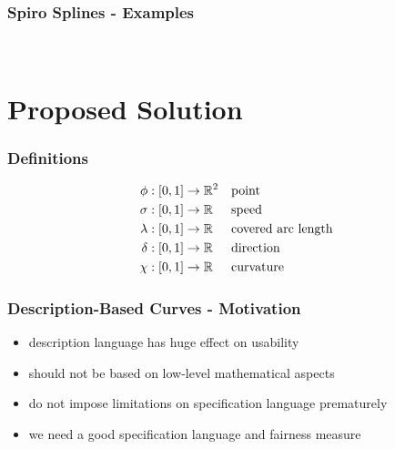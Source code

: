 \documentclass[mathserif]{beamer}
\begin{document}
		\begin{frame}
			\frametitle{Spiro Splines - Examples}
			\\
		\end{frame}
	
	\section{Proposed Solution}

		\begin{frame}
			\frametitle{Definitions}
			\begin{align*}
				\phi    & : \left[ 0,1 \right] \rightarrow \mathbb{R}^{2} && \text{point}\\
				\sigma  & : \left[ 0,1 \right] \rightarrow \mathbb{R}   && \text{speed}\\
				\lambda & : \left[ 0,1 \right] \rightarrow \mathbb{R}   && \text{covered arc length}\\
				\delta  & : \left[ 0,1 \right] \rightarrow \mathbb{R}   && \text{direction}\\
				\chi    & : \left[ 0,1 \right] \rightarrow \mathbb{R}   && \text{curvature}
			\end{align*}
		\end{frame}

		\begin{frame}
			\frametitle{Description-Based Curves - Motivation}
			\begin{itemize}
				\item description language has huge effect on usability
				\item should not be based on low-level mathematical aspects %
				\item do not impose limitations on specification language prematurely %
				\item we need a good specification language and fairness measure
			\end{itemize}
		\end{frame}
\end{document}
